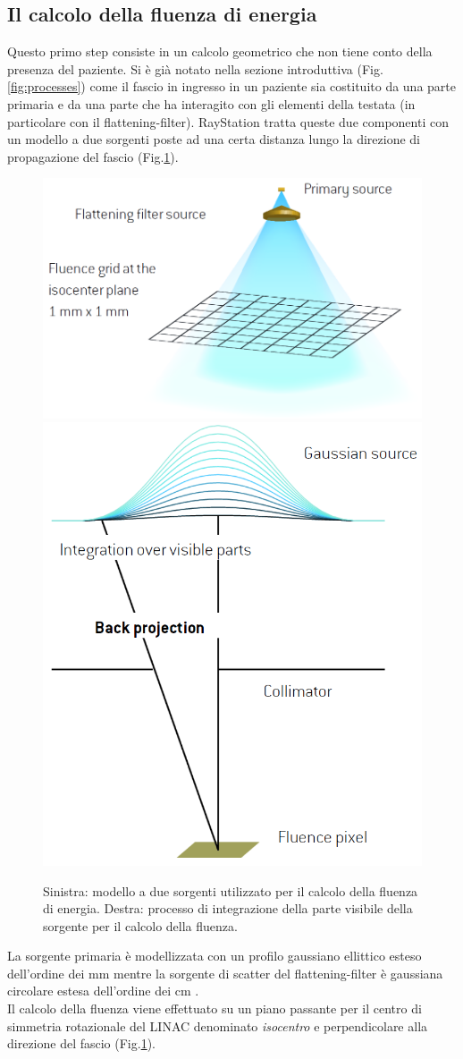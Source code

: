 {\subsection{Il calcolo della fluenza di energia}
\label{sec:fluence}
Questo primo step consiste in un calcolo geometrico che non tiene conto della presenza del paziente. Si è già notato nella sezione introduttiva (Fig.\ref{fig:processes}) come il fascio in ingresso in un paziente sia costituito da una parte primaria e da una parte che ha interagito con gli elementi della testata (in particolare con il flattening-filter). RayStation tratta queste due componenti con un modello a due sorgenti poste ad una certa distanza lungo la direzione di propagazione del fascio (Fig.\ref{fig:twosources}).
\begin{figure}
\centering
\includegraphics[width=.55\textwidth]{./cap1/twosources.png}
\includegraphics[width=.4\textwidth]{./cap1/source_int.png}
\caption{Sinistra: modello a due sorgenti utilizzato per il calcolo della fluenza di energia. Destra: processo di integrazione della parte visibile della sorgente per il calcolo della fluenza.}
\label{fig:twosources}
\end{figure}
La sorgente primaria è modellizzata con un profilo gaussiano ellittico esteso dell'ordine dei mm mentre la sorgente di scatter del flattening-filter è gaussiana circolare estesa dell'ordine dei cm \cite{Chaney1994}.\\
Il calcolo della fluenza viene effettuato su un piano passante per il centro di simmetria rotazionale del LINAC denominato \textit{isocentro} e perpendicolare alla direzione del fascio (Fig.\ref{fig:twosources}).
}
